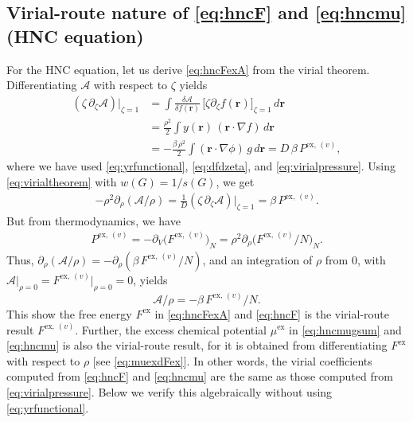 \documentclass[preprint]{revtex4-1}
\newcommand{\vct}[1]{\mathbf{#1}}
\providecommand{\vr}{} %
\renewcommand{\vr}{\vct{r}}
\newcommand{\supex}[1]{ { { #1 }^{ \mathrm{ex} } } }
\newcommand{\supexv}[1]{ { { #1 }^{ \mathrm{ex}, \, (v) } } }
\newcommand{\Pexv}{\supexv{P}}
\newcommand{\Fex}{\supex{F}}
\newcommand{\Fexv}{\supexv{F}}
\newcommand{\muex}{\supex{\mu}}
\newcommand{\A}{\mathcal{A}}
\begin{document}
\subsection{\label{sec:vthnc}Virial-route nature of \eqref{eq:hncF} and \eqref{eq:hncmu} (HNC equation)}

For the HNC equation, let us derive \eqref{eq:hncFexA} from the virial theorem.
%
Differentiating $\A$ with respect to $\zeta$ yields
\begin{align*}
  (\zeta \, \partial_\zeta \A) \big|_{\zeta = 1}
&=
  \int \frac{ \delta \A } { \delta f(\vr) } \,
  \big[ \zeta \partial_\zeta f(\vr) \big]_{\zeta = 1} \, d\vr
  \\
&=
  \frac{\rho^2}{2}
  \int y(\vr) \,
  (\vr \cdot \nabla f) \, d\vr
  \\
&=
  -\frac{ \beta \, \rho^2}{2}
  \int (\vr \cdot \nabla \phi) \, g \, d\vr
= D \, \beta \, \Pexv,
\end{align*}
where we have used \eqref{eq:yrfunctional},
\eqref{eq:dfdzeta}, and \eqref{eq:virialpressure}.
%
Using \eqref{eq:virialtheorem}
with $w(G) = 1/s(G)$, we get
\begin{align*}
  -\rho^2 \partial_\rho ( \A/\rho )
=
  \frac{1}{D} (\zeta \, \partial_\zeta \A) \big|_{\zeta = 1}
=
  \beta \, \Pexv.
\end{align*}
%
But from thermodynamics, we have
\begin{align*}
  \Pexv
=
  -\partial_V \bigl( \Fexv \bigr)_N
=
  \rho^2 \partial_\rho \bigl( \Fexv/N \bigr)_N.
\end{align*}
%
Thus,
$\partial_\rho (\A/\rho)  = -\partial_\rho( \beta \, \Fexv/N )$,
and an integration of $\rho$ from 0,
with $\A \big|_{\rho = 0} = \Fexv \big|_{\rho = 0} = 0$, yields
\[
  \A/\rho = -\beta \, \Fexv/N.
\]
This show the free energy $\Fex$ in \eqref{eq:hncFexA} and \eqref{eq:hncF}
is the virial-route result $\Fexv$.
%
%
Further, the excess chemical potential
$\muex$ in \eqref{eq:hncmugsum} and \eqref{eq:hncmu}
is also the virial-route result,
for it is obtained from differentiating $\Fex$
with respect to $\rho$
[see \eqref{eq:muexdFex}].
%
In other words,
the virial coefficients computed from
\eqref{eq:hncF} and \eqref{eq:hncmu}
are the same as those computed from
\eqref{eq:virialpressure}.
%
Below we verify this algebraically
without using \eqref{eq:yrfunctional}.
\end{document}
